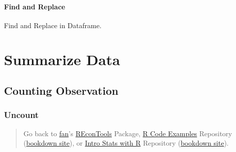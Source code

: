 \documentclass[
]{book}
\newenvironment{Shaded}{\begin{snugshade}}{\end{snugshade}}
\newcommand{\CommentTok}[1]{\textcolor[rgb]{0.56,0.35,0.01}{\textit{#1}}}
\newcommand{\FunctionTok}[1]{\textcolor[rgb]{0.00,0.00,0.00}{#1}}
\newcommand{\NormalTok}[1]{#1}
\newcommand{\SpecialCharTok}[1]{\textcolor[rgb]{0.00,0.00,0.00}{#1}}
\newcommand{\StringTok}[1]{\textcolor[rgb]{0.31,0.60,0.02}{#1}}
\begin{document}
\hypertarget{find-and-replace}{%
\subsubsection{Find and Replace}\label{find-and-replace}}

Find and Replace in Dataframe.

\begin{Shaded}
\end{Shaded}

\hypertarget{summarize-data}{%
\chapter{Summarize Data}\label{summarize-data}}

\hypertarget{counting-observation}{%
\section{Counting Observation}\label{counting-observation}}

\hypertarget{uncount}{%
\subsection{Uncount}\label{uncount}}

\begin{quote}
Go back to \href{http://fanwangecon.github.io/}{fan}'s \href{https://fanwangecon.github.io/REconTools/}{REconTools} Package, \href{https://fanwangecon.github.io/R4Econ/}{R Code Examples} Repository (\href{https://fanwangecon.github.io/R4Econ/bookdown}{bookdown site}), or \href{https://fanwangecon.github.io/Stat4Econ/}{Intro Stats with R} Repository (\href{https://fanwangecon.github.io/Stat4Econ/bookdown}{bookdown site}).
\end{quote}
\end{document}
